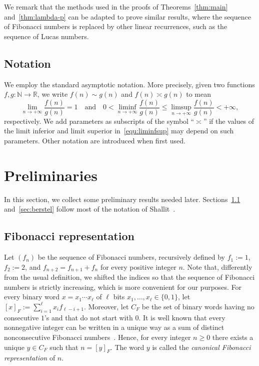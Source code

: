 \documentclass[11pt]{article}
\theoremstyle{remark}\newtheorem{remark}[theorem]{Remark}
\begin{document}
We remark that the methods used in the proofs of Theorems~\ref{thm:main} and~\ref{thm:lambda-p} can be adapted to prove similar results, where the sequence of Fibonacci numbers is replaced by other linear recurrences, such as the sequence of Lucas numbers.

\subsection*{Notation}

We employ the standard asymptotic notation.
More precisely, given two functions $f, g \colon \mathbb{N} \to \mathbb{R}$, we write $f(n) \sim g(n)$ and $f(n) \asymp g(n)$ to mean
\begin{equation}\label{equ:liminfsup}
	\lim_{n \to +\infty} \frac{f(n)}{g(n)} = 1 \quad\text{and}\quad
	0 < \liminf_{n \to +\infty} \frac{f(n)}{g(n)} \leq \limsup_{n \to +\infty} \frac{f(n)}{g(n)} < +\infty ,
\end{equation}
respectively.
We add parameters as subscripts of the symbol ``$\asymp$'' if the values of the limit inferior and limit superior in~\eqref{equ:liminfsup} may depend on such parameters.
Other notation are introduced when first used.

\section{Preliminaries}

In this section, we collect some preliminary results needed later.
Sections~\ref{sec:zeck} and~\ref{sec:berstel} follow most of the notation of Shallit~\cite[Section~3]{MR4195833}.

\subsection{Fibonacci representation}\label{sec:zeck}

Let $(f_n)$ be the sequence of Fibonacci numbers, recursively defined by $f_1 := 1$, $f_2 := 2$, and $f_{n + 2} = f_{n + 1} + f_n$ for every positive integer $n$.
Note that, differently from the usual definition, we shifted the indices so that the sequence of Fibonacci numbers is strictly increasing, which is more convenient for our purposes.
For every binary word $x = x_1 \cdots x_\ell$ of $\ell$ bits $x_1, \dots, x_\ell \in \{0,1\}$, let $[x]_F := \sum_{i=1}^\ell x_i f_{\ell - i + 1}$.
Moreover, let $C_F$ be the set of binary words having no consecutive $1$'s and that do not start with $0$.
It is well known that every nonnegative integer can be written in a unique way as a sum of distinct nonconsecutive Fibonacci numbers~\cite{MR0308032}.
Hence, for every integer $n \geq 0$ there exists a unique $y \in C_F$ such that $n = [y]_F$.
The word $y$ is called the \emph{canonical Fibonacci representation} of $n$.
\end{document}
